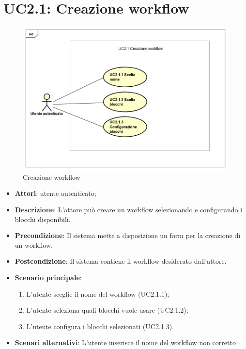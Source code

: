 \section{UC2.1: Creazione workflow}
\label{UC2.1}
\begin{figure} [h]
	\centering
	\includegraphics[scale=0.4]{./Diagram/UC2-1.png}
	\caption{Creazione workflow}\label{}
\end{figure}
\begin{itemize}
	\item \textbf{Attori}: utente autenticato;
	\item \textbf{Descrizione}: L'attore può creare un workflow selezionando e configurando i blocchi disponibili.
	\item \textbf{Precondizione}: Il sistema mette a disposizione un form per la creazione di un workflow.
	\item \textbf{Postcondizione}: Il sistema contiene il workflow desiderato dall'attore.
	\item \textbf{Scenario principale}:
	\begin{enumerate} \item L'utente sceglie il nome del workflow (UC2.1.1);  \item  L'utente seleziona quali blocchi vuole usare (UC2.1.2);  \item 
		L'utente configura i blocchi selezionati (UC2.1.3).\end{enumerate}
	\item \textbf{Scenari alternativi}:
	L'utente inserisce il nome del workflow non corretto
\end{itemize}

